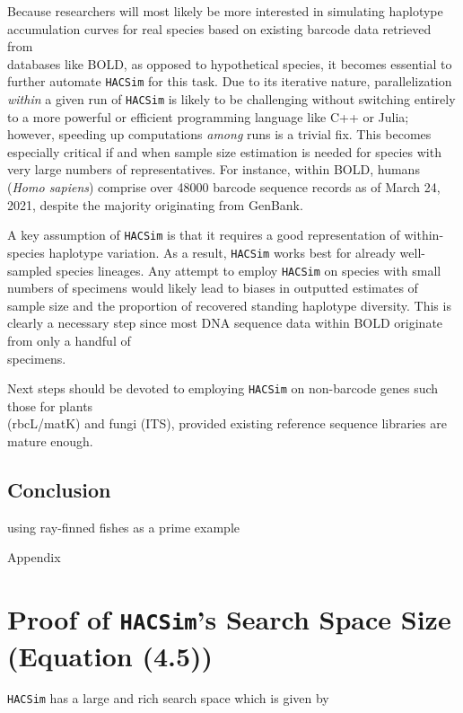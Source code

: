 Because researchers will most likely be more interested in simulating haplotype \\ accumulation curves for real species based on existing barcode data retrieved from \\ databases like BOLD, as opposed to hypothetical species, it becomes essential to further automate {\tt HACSim} for this task. Due to its iterative nature, parallelization \textit{within} a given run of {\tt HACSim} is likely to be challenging without switching entirely to a more powerful or efficient programming language like C++ or Julia; however, speeding up computations \textit{among} runs is a trivial fix. This becomes especially critical if and when sample size estimation is needed for species with very large numbers of representatives. For instance, within BOLD, humans (\textit{Homo sapiens}) comprise over 48000 barcode sequence records as of March 24, 2021, despite the majority originating from GenBank. 

A key assumption of {\tt HACSim} is that it requires a good representation of within-species haplotype variation. As a result, {\tt HACSim} works best for already well-sampled species lineages. Any attempt to employ {\tt HACSim} on species with small numbers of specimens would likely lead to biases in outputted estimates of sample size and the proportion of recovered standing haplotype diversity.  This is clearly a necessary step since most DNA sequence data within BOLD originate from only a handful of \\ specimens.


Next steps should be devoted to employing {\tt HACSim} on non-barcode genes such those for plants \\ (rbcL/matK) and fungi (ITS), provided existing reference sequence libraries are mature enough.

\section{Conclusion}

using ray-finned fishes as a prime example


Appendix

\chapter{Proof of {\tt HACSim}'s Search Space Size (Equation (4.5))}

{\tt HACSim} has a large and rich search space which is given by


